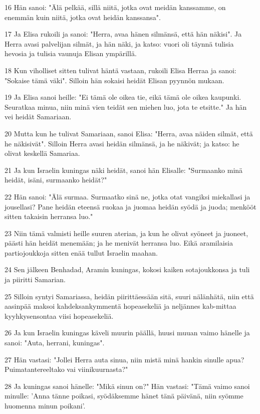 \par 16 Hän sanoi: "Älä pelkää, sillä niitä, jotka ovat meidän kanssamme, on enemmän kuin niitä, jotka ovat heidän kanssansa".
\par 17 Ja Elisa rukoili ja sanoi: "Herra, avaa hänen silmänsä, että hän näkisi". Ja Herra avasi palvelijan silmät, ja hän näki, ja katso: vuori oli täynnä tulisia hevosia ja tulisia vaunuja Elisan ympärillä.
\par 18 Kun viholliset sitten tulivat häntä vastaan, rukoili Elisa Herraa ja sanoi: "Sokaise tämä väki". Silloin hän sokaisi heidät Elisan pyynnön mukaan.
\par 19 Ja Elisa sanoi heille: "Ei tämä ole oikea tie, eikä tämä ole oikea kaupunki. Seuratkaa minua, niin minä vien teidät sen miehen luo, jota te etsitte." Ja hän vei heidät Samariaan.
\par 20 Mutta kun he tulivat Samariaan, sanoi Elisa: "Herra, avaa näiden silmät, että he näkisivät". Silloin Herra avasi heidän silmänsä, ja he näkivät; ja katso: he olivat keskellä Samariaa.
\par 21 Ja kun Israelin kuningas näki heidät, sanoi hän Elisalle: "Surmaanko minä heidät, isäni, surmaanko heidät?"
\par 22 Hän sanoi: "Älä surmaa. Surmaatko sinä ne, jotka otat vangiksi miekallasi ja jousellasi? Pane heidän eteensä ruokaa ja juomaa heidän syödä ja juoda; menkööt sitten takaisin herransa luo."
\par 23 Niin tämä valmisti heille suuren aterian, ja kun he olivat syöneet ja juoneet, päästi hän heidät menemään; ja he menivät herransa luo. Eikä aramilaisia partiojoukkoja sitten enää tullut Israelin maahan.
\par 24 Sen jälkeen Benhadad, Aramin kuningas, kokosi kaiken sotajoukkonsa ja tuli ja piiritti Samarian.
\par 25 Silloin syntyi Samariassa, heidän piirittäessään sitä, suuri nälänhätä, niin että aasinpää maksoi kahdeksankymmentä hopeasekeliä ja neljännes kab-mittaa kyyhkysensontaa viisi hopeasekeliä.
\par 26 Ja kun Israelin kuningas käveli muurin päällä, huusi muuan vaimo hänelle ja sanoi: "Auta, herrani, kuningas".
\par 27 Hän vastasi: "Jollei Herra auta sinua, niin mistä minä hankin sinulle apua? Puimatantereeltako vai viinikuurnasta?"
\par 28 Ja kuningas sanoi hänelle: "Mikä sinun on?" Hän vastasi: "Tämä vaimo sanoi minulle: 'Anna tänne poikasi, syödäksemme hänet tänä päivänä, niin syömme huomenna minun poikani'.

